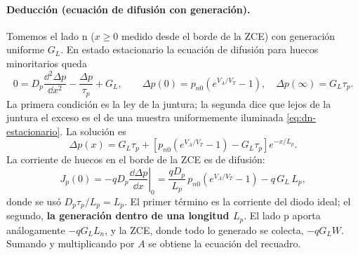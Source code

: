 \paragraph{Deducción (ecuación de difusión con generación).} Tomemos el lado n
($x\ge0$ medido desde el borde de la ZCE) con generación uniforme $G_L$. En estado
estacionario la ecuación de difusión para huecos minoritarios queda
\[
  0 = D_p\frac{\dd^2\Delta p}{\dd x^2} - \frac{\Delta p}{\tau_p} + G_L,
  \qquad
  \Delta p(0) = p_{n0}\left(e^{V_A/V_T}-1\right),
  \quad
  \Delta p(\infty) = G_L\tau_p .
\]
La primera condición es la ley de la juntura; la segunda dice que lejos de la juntura el
exceso es el de una muestra uniformemente iluminada \eqref{eq:dn-estacionario}. La solución es
\[
  \Delta p(x) = G_L\tau_p + \left[p_{n0}\left(e^{V_A/V_T}-1\right)-G_L\tau_p\right]e^{-x/L_p}.
\]
La corriente de huecos en el borde de la ZCE es de difusión:
\[
  J_p(0) = -qD_p\left.\frac{\dd\Delta p}{\dd x}\right|_0
  = \frac{qD_p}{L_p}\,p_{n0}\left(e^{V_A/V_T}-1\right) - q\,G_L\,L_p ,
\]
donde se usó $D_p\tau_p/L_p=L_p$. El primer término es la corriente del diodo ideal; el
segundo, \textbf{la generación dentro de una longitud $L_p$}. El lado p aporta análogamente
$-qG_LL_n$, y la ZCE, donde todo lo generado se colecta, $-qG_LW$. Sumando y
multiplicando por $A$ se obtiene la ecuación del recuadro.


